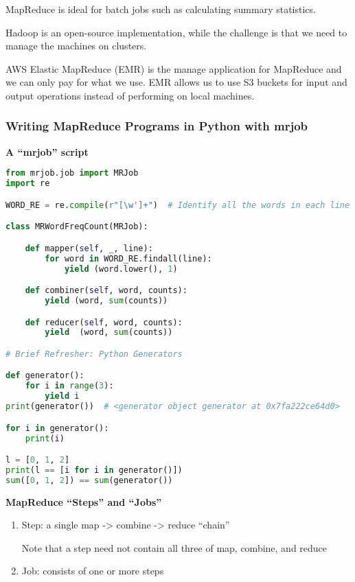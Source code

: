 \documentclass{article}
\begin{document}
MapReduce is ideal for batch jobs such as calculating summary statistics.

Hadoop is an open-source implementation, while the challenge is that we need to manage the machines on clusters.

AWS Elastic MapReduce (EMR) is the manage application for MapReduce and we can only pay for what we use. EMR allows us to use S3 buckets for input and output operations instead of performing on local machines.

\subsubsection{Writing MapReduce Programs in Python with mrjob}

\textbf{A ``mrjob'' script}

\begin{lstlisting}[language=Python]
from mrjob.job import MRJob
import re

WORD_RE = re.compile(r"[\w']+")  # Identify all the words in each line of text

class MRWordFreqCount(MRJob):

    def mapper(self, _, line):
        for word in WORD_RE.findall(line):
            yield (word.lower(), 1)

    def combiner(self, word, counts):
        yield (word, sum(counts))

    def reducer(self, word, counts):
        yield  (word, sum(counts))

# Brief Refresher: Python Generators

def generator():
    for i in range(3):
        yield i
print(generator())  # <generator object generator at 0x7fa222ce64d0>

for i in generator():
    print(i)

l = [0, 1, 2]
print(l == [i for i in generator()])
sum([0, 1, 2]) == sum(generator())
\end{lstlisting}

\textbf{MapReduce ``Steps'' and ``Jobs''}
\begin{enumerate}
    \item Step: a single map -> combine -> reduce ``chain''

    Note that a step need not contain all three of map, combine, and reduce
    
    \item Job: consists of one or more steps
\end{enumerate}
\end{document}
